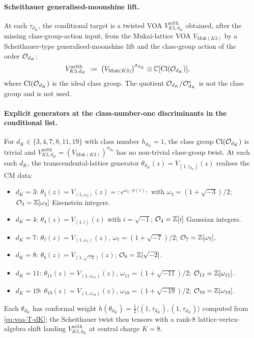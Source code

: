 \paragraph{Scheithauer generalised-moonshine lift.}
At each $\tau_{d_K}$, the conditional target is a twisted VOA
$V^{\mathrm{arith}}_{K3, d_K}$ obtained, after the missing
class-group-action input, from the Mukai-lattice VOA
$V_{\mathrm{Muk}(K3)}$ by a Scheithauer-type
generalised-moonshine lift and the class-group action of the order
$\mathcal{O}_{d_K}$:
\begin{equation}
\label{eq:voa-Vari-K3-dK}
  V^{\mathrm{arith}}_{K3, d_K} \;:=\;
  \bigl(V_{\mathrm{Muk}(K3)}\bigr)^{\sigma_{d_K}}
  \otimes \mathbb{C}[\mathrm{Cl}(\mathcal{O}_{d_K})],
\end{equation}
where $\mathrm{Cl}(\mathcal{O}_{d_K})$ is the ideal class group. The quotient
$\mathcal{O}_{d_K}/\mathcal{O}_{d_K}^*$ is not the class group and is not used.

\paragraph{Explicit generators at the class-number-one discriminants in the conditional list.}
For $d_K \in \{3, 4, 7, 8, 11, 19\}$ with class number $h_{d_K} = 1$,
the class group $\mathrm{Cl}(\mathcal{O}_{d_K})$ is trivial and
$V^{\mathrm{arith}}_{K3, d_K} = (V_{\mathrm{Muk}(K3)})^{\sigma_{d_K}}$
has no non-trivial class-group twist. At each such $d_K$, the transcendental-lattice
generator $\theta_{d_K}(z) = V_{(1, \tau_{d_K})}(z)$ realises the
CM data:
\begin{itemize}
\item $d_K = 3$: $\theta_3(z) = V_{(1, \omega_3)}(z) = {:}e^{\omega_3\cdot\phi(z)}{:}$ with
$\omega_3 = (1 + \sqrt{-3})/2$; $\mathcal O_3 = \mathbb{Z}[\omega_3]$ Eisenstein integers.
\item $d_K = 4$: $\theta_4(z) = V_{(1, i)}(z)$ with $i = \sqrt{-1}$;
$\mathcal O_4 = \mathbb{Z}[i]$ Gaussian integers.
\item $d_K = 7$: $\theta_7(z) = V_{(1, \omega_7)}(z)$, $\omega_7 = (1 + \sqrt{-7})/2$;
$\mathcal O_7 = \mathbb{Z}[\omega_7]$.
\item $d_K = 8$: $\theta_8(z) = V_{(1, \sqrt{-2})}(z)$; $\mathcal O_8 = \mathbb{Z}[\sqrt{-2}]$.
\item $d_K = 11$: $\theta_{11}(z) = V_{(1, \omega_{11})}(z)$, $\omega_{11} = (1 + \sqrt{-11})/2$;
$\mathcal O_{11} = \mathbb{Z}[\omega_{11}]$.
\item $d_K = 19$: $\theta_{19}(z) = V_{(1, \omega_{19})}(z)$, $\omega_{19} = (1 + \sqrt{-19})/2$;
$\mathcal O_{19} = \mathbb{Z}[\omega_{19}]$.
\end{itemize}
Each $\theta_{d_K}$ has conformal weight
$h(\theta_{d_K}) = \tfrac{1}{2}\langle (1,\tau_{d_K}), (1,\tau_{d_K})\rangle$
computed from \eqref{eq:voa-T-dK}; the Scheithauer twist then
tensors with a rank-$8$ lattice-vertex-algebra shift landing
$V^{\mathrm{arith}}_{K3, d_K}$ at central charge $K = 8$.

